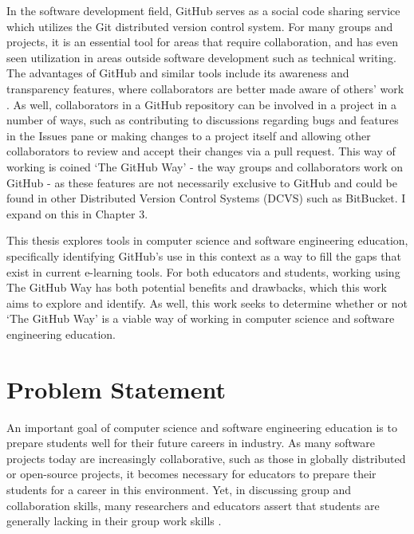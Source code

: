 In the software development field, GitHub serves as a social code sharing service which utilizes the Git distributed version control system. For many groups and projects, it is an essential tool for areas that require collaboration, and has even seen utilization in areas outside software development such as technical writing. The advantages of GitHub and similar tools include its awareness and transparency features, where collaborators are better made aware of others' work \cite{dabbish2012social}. As well, collaborators in a GitHub repository can be involved in a project in a number of ways, such as contributing to discussions regarding bugs and features in the Issues pane or making changes to a project itself and allowing other collaborators to review and accept their changes via a pull request. This way of working is coined `The GitHub Way' - the way groups and collaborators work on GitHub - as these features are not necessarily exclusive to GitHub and could be found in other Distributed Version Control Systems (DCVS) such as BitBucket. I expand on this in Chapter 3.

This thesis explores tools in computer science and software engineering education, specifically identifying GitHub's use in this context as a way to fill the gaps that exist in current e-learning tools. For both educators and students, working using The GitHub Way has both potential benefits and drawbacks, which this work aims to explore and identify. As well, this work seeks to determine whether or not `The GitHub Way' is a viable way of working in computer science and software engineering education.

\section{Problem Statement}
An important goal of computer science and software engineering education is to prepare students well for their future careers in industry. As many software projects today are increasingly collaborative, such as those in globally distributed or open-source projects, it becomes necessary for educators to prepare their students for a career in this environment. Yet, in discussing group and collaboration skills, many researchers and educators assert that students are generally lacking in their group work skills \cite{waite2004student}.


